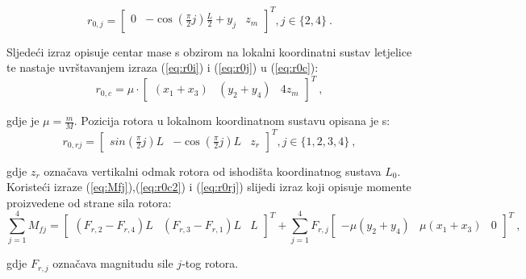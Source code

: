 \documentclass[11pt,a4paper]{article}
\begin{document}
\begin{equation}
r_{0,j} = \left[
\begin{matrix}
0 & -\cos\left(\frac{\pi}{2}j\right)\frac{L}{2} + y_{j} & z_{m}
\end{matrix} \right] ^{T}, j \in \{ 2, 4\} \ .
\label{eq:r0j}
\end{equation}

 
Sljedeći izraz opisuje centar mase s obzirom na lokalni koordinatni sustav letjelice te nastaje uvrštavanjem izraza (\ref{eq:r0i}) i (\ref{eq:r0j}) u (\ref{eq:r0c}):
\begin{equation}
r_{0,c} = \mu \cdot \left[
\begin{matrix}
(x_{1} + x_{3}) & (y_{2} + y_{4}) & 4z_{m}
\end{matrix} \right]^{T} \ ,
\label{eq:r0c2}
\end{equation}

gdje je $\mu = \frac{m}{M}$. Pozicija rotora u lokalnom koordinatnom sustavu opisana je s:
\begin{equation}
r_{0,rj} = \left[
\begin{matrix}
sin\left(\frac{\pi}{2}j\right)L & -\cos\left(\frac{\pi}{2}j\right)L & z_{r}
\end{matrix} \right] ^{T}, j \in \{ 1, 2, 3, 4\} \ ,
\label{eq:r0rj}
\end{equation}

gdje $z_{r}$ označava vertikalni odmak rotora od ishodišta koordinatnog sustava $L_{0}$. Koristeći izraze (\ref{eq:Mfj}),(\ref{eq:r0c2}) i (\ref{eq:r0rj}) slijedi izraz koji opisuje momente proizvedene od strane sila rotora:
\begin{equation}
\sum_{j=1}^{4}M_{fj} = \left[
\begin{matrix}
(F_{r,2} - F_{r,4})L & (F_{r,3} - F_{r,1})L & L
\end{matrix}\right]^{T} + \sum_{j=1}^{4}F_{r,j} 
\left[\begin{matrix}
-\mu(y_{2} + y_{4}) & \mu(x_{1} + x_{3}) & 0
\end{matrix}\right]^{T} \ ,
\label{eq:sumaMfj}
\end{equation}

gdje $F_{r,j}$ označava magnitudu sile $j$-tog rotora. 

\medskip
\end{document}
